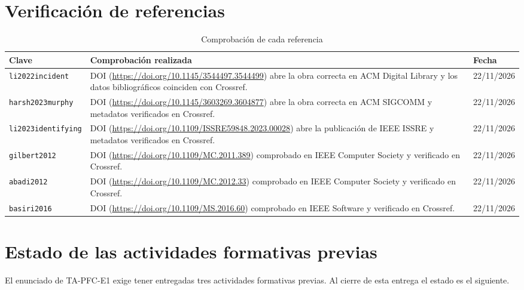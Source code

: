 \section{Verificación de referencias}

\begin{table}[H]
\centering
\caption{Comprobación de cada referencia}
\small
\begin{tabularx}{\linewidth}{@{}lYl@{}}
\toprule
Clave & Comprobación realizada & Fecha \\
\midrule
\texttt{li2022incident} & DOI (\url{https://doi.org/10.1145/3544497.3544499}) abre la obra correcta en ACM Digital Library y los datos bibliográficos coinciden con Crossref. & 22/11/2026 \\
\addlinespace
\texttt{harsh2023murphy} & DOI (\url{https://doi.org/10.1145/3603269.3604877}) abre la obra correcta en ACM SIGCOMM y metadatos verificados en Crossref. & 22/11/2026 \\
\addlinespace
\texttt{li2023identifying} & DOI (\url{https://doi.org/10.1109/ISSRE59848.2023.00028}) abre la publicación de IEEE ISSRE y metadatos verificados en Crossref. & 22/11/2026 \\
\addlinespace
\texttt{gilbert2012} & DOI (\url{https://doi.org/10.1109/MC.2011.389}) comprobado en IEEE Computer Society y verificado en Crossref. & 22/11/2026 \\
\addlinespace
\texttt{abadi2012} & DOI (\url{https://doi.org/10.1109/MC.2012.33}) comprobado en IEEE Computer Society y verificado en Crossref. & 22/11/2026 \\
\addlinespace
\texttt{basiri2016} & DOI (\url{https://doi.org/10.1109/MS.2016.60}) comprobado en IEEE Software y verificado en Crossref. & 22/11/2026 \\
\bottomrule
\end{tabularx}
\end{table}

\section{Estado de las actividades formativas previas}
\label{anexo:formativas}

El enunciado de TA-PFC-E1 exige tener entregadas tres actividades formativas previas. Al cierre de
esta entrega el estado es el siguiente.

